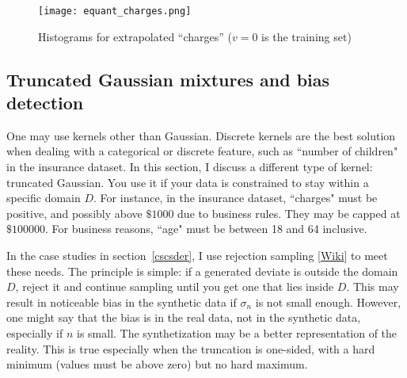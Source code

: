 \documentclass[oneside,10pt]{book}
\begin{document}
\begin{figure}[H]
\centering
\texttt{[image: equant\_charges.png]}  
\caption{Histograms for extrapolated ``charges'' ($v=0$ is the training set)}
\label{figttyd38675}
\end{figure}


\subsection{Truncated Gaussian mixtures and bias detection}

 One may use kernels other than Gaussian. Discrete kernels are the best solution when dealing with a 
 categorical or discrete
 feature, such as ``number of children" in the insurance dataset. In this section, I discuss a different type
 of kernel: \textcolor{index}{truncated Gaussian}. You use it if your data is constrained to stay within a specific domain $D$.
 For instance, in the insurance dataset, ``charges" must be positive, and possibly above $\$1000$ due to
 business rules. They may be capped at $\$\num{100000}$. For business reasons, ``age" must be
 between 18 and 64 inclusive. 

In the case studies in section~\ref{cscsder}, I use \textcolor{index}{rejection sampling} [\href{https://en.wikipedia.org/wiki/Rejection_sampling}{Wiki}] to meet these needs. The principle is simple: 
 if a generated deviate is outside the domain $D$, reject it and continue sampling until you get one that lies inside $D$. This may result in noticeable bias in the synthetic data if $\sigma_n$ is not small enough.
 However, one might say that the bias is in the real data,  not in the synthetic data, especially if $n$ is small.
 The synthetization may be a better representation of the reality. This is true especially when the truncation
 is one-sided, with a hard minimum (values must be above zero) but no hard maximum.
\end{document}
